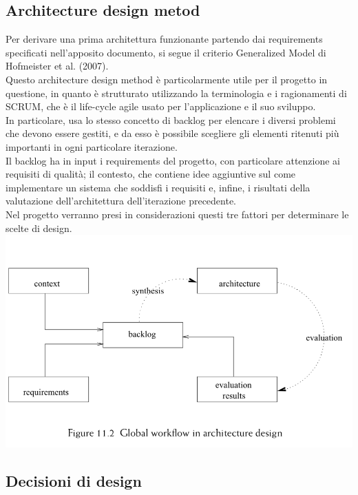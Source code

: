 \documentclass{article}
\begin{document}
\begin{itemize}
\subsection{Architecture design metod }
Per derivare una prima architettura funzionante partendo dai requirements specificati nell’apposito documento, si segue il criterio Generalized Model di Hofmeister et al. (2007).
\\Questo architecture design method è particolarmente utile per il progetto in questione, in quanto è strutturato utilizzando la terminologia e i ragionamenti di SCRUM, che è il life-cycle agile usato per l’applicazione e il suo sviluppo. 
\\In particolare, usa lo stesso concetto di backlog per elencare i diversi problemi che devono essere gestiti, e da esso è possibile scegliere gli elementi ritenuti più importanti in ogni particolare iterazione. 
\\Il backlog ha in input i requirements del progetto, con particolare attenzione ai requisiti di qualità; il contesto, che contiene idee aggiuntive sul come implementare un sistema che soddisfi i requisiti e, infine, i risultati della valutazione dell’architettura dell’iterazione precedente. 
\\Nel progetto verranno presi in considerazioni questi tre fattori per determinare le scelte di design. 
\\\includegraphics[scale = 0.75]{"Immagini/GeneralizedModel.png"}
\subsection{Decisioni di design} 

\end{itemize}
\end{document}
